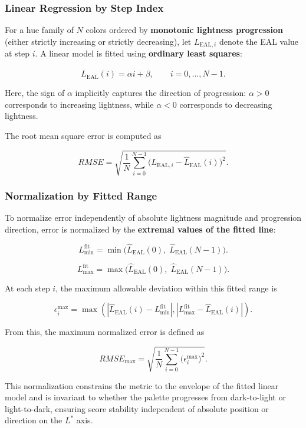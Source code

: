 \subsubsection{Linear Regression by Step Index}

For a hue family of $N$ colors ordered by \textbf{monotonic lightness
progression} (either strictly increasing or strictly decreasing), let
$L_{\mathrm{EAL},i}$ denote the EAL value at step $i$.
A linear model is fitted using \textbf{ordinary least squares}:

\[
\hat{L}_{\mathrm{EAL}}(i) = \alpha i + \beta,
\qquad i = 0, \dots, N-1.
\]

Here, the sign of $\alpha$ implicitly captures the direction of
progression: $\alpha > 0$ corresponds to increasing lightness, while
$\alpha < 0$ corresponds to decreasing lightness.

The root mean square error is computed as

\[
RMSE =
\sqrt{
\frac{1}{N}
\sum_{i=0}^{N-1}
\bigl(
L_{\mathrm{EAL},i} -
\hat{L}_{\mathrm{EAL}}(i)
\bigr)^2
}.
\]

\subsubsection{Normalization by Fitted Range}

To normalize error independently of absolute lightness magnitude and
progression direction, error is normalized by the
\textbf{extremal values of the fitted line}:

\[
L_{\min}^{\text{fit}} =
\min\!\bigl(
\hat{L}_{\mathrm{EAL}}(0),\;
\hat{L}_{\mathrm{EAL}}(N-1)
\bigr).
\]

\[
L_{\max}^{\text{fit}} =
\max\!\bigl(
\hat{L}_{\mathrm{EAL}}(0),\;
\hat{L}_{\mathrm{EAL}}(N-1)
\bigr).
\]


At each step $i$, the maximum allowable deviation within this fitted
range is

\[
\epsilon_i^{\max} =
\max\!\left(
\left|
\hat{L}_{\mathrm{EAL}}(i) - L_{\min}^{\text{fit}}
\right|,
\left|
L_{\max}^{\text{fit}} - \hat{L}_{\mathrm{EAL}}(i)
\right|
\right).
\]

From this, the maximum normalized error is defined as

\[
RMSE_{\max} =
\sqrt{
\frac{1}{N}
\sum_{i=0}^{N-1}
\bigl(
\epsilon_i^{\max}
\bigr)^2
}.
\]

This normalization constrains the metric to the envelope of the fitted
linear model and is invariant to whether the palette progresses from
dark-to-light or light-to-dark, ensuring score stability independent of
absolute position or direction on the $L^*$ axis.

